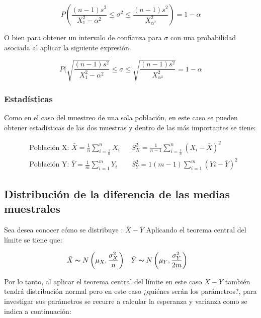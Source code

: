 \begin{equation}
    P\left( \frac{(n-1)s^2}{X^2_1-\alpha^2} \leq \sigma^2\leq \frac{(n-1)s^2}{X_{\alpha^2}^2} \right)=1-\alpha
\end{equation}

O bien para obtener un intervalo de confianza para $\sigma$  con una probabilidad
asociada al aplicar la siguiente expresión.

\begin{equation}
    P(\sqrt{\frac{(n-1)s^2}{X^2_1-\alpha^2}}\leq \sigma \leq \sqrt{\frac{(n-1)s^2}{X_{\alpha^2}^2}}=1-\alpha
\end{equation}


\subsubsection{Estadísticas}

Como en el caso del muestreo de una sola población, en este caso se pueden obtener estadísticas de las dos muestras y dentro de las más importantes se tiene:

\begin{align}
     & \text{Población X: }\bar{X} =\frac{1}{n}\sum_{i=\frac{1}{n}}^nX_i &  & S_X^2 =\frac{1}{n-1} \sum_{i=\frac{1}{n}}^n(X_i-\bar{X} )^2\\
     & \text{Población Y: }\bar{Y}=\frac{1}{m}\sum_{i=1}^m Y_i           &  & S_Y^2 =1(m-1) \sum_{i=1}^m\left( Y i-\bar{Y} \right)^2
\end{align}


\subsection{Distribución de la diferencia de las medias muestrales}

Sea desea conocer cómo se distribuye : $\bar{X} -\bar{Y}$
Aplicando el teorema central del límite se tiene
que:

\begin{align*}
     & \bar{X} \thicksim  N\left( \mu_X,\frac{\sigma_X^2}{n} \right) &  & \bar{Y} \thicksim  N\left( \mu_Y,\frac{\sigma^2_Y}{2m} \right)
\end{align*}

Por lo tanto, al aplicar el teorema central del límite en este caso $\bar{X} -\bar{Y}$ también tendrá distribución normal pero en este caso ¿quiénes serán los parámetros?, para investigar sus parámetros se recurre a calcular la esperanza y varianza como se indica a continuación:

